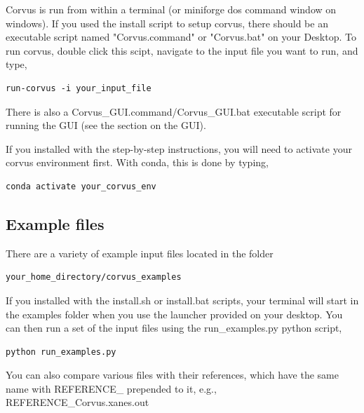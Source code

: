 Corvus is run from within a terminal (or miniforge dos command window on windows). If you used the 
install script to setup corvus, there should be an executable script named "Corvus.command" or "Corvus.bat" 
on your Desktop. To run corvus, double click this scipt, navigate to the input file you want 
to run, and type,
\begin{verbatim}
run-corvus -i your_input_file
\end{verbatim}
There is also a Corvus\_GUI.command/Corvus\_GUI.bat executable script for running the GUI (see the section on the GUI).

If you installed with the step-by-step instructions, you will need to activate your
corvus environment first. With conda, this is done by typing,
\begin{verbatim}
conda activate your_corvus_env
\end{verbatim}

\subsection{Example files}
There are a variety of example input files located in the folder
\begin{verbatim}
your_home_directory/corvus_examples
\end{verbatim}
If you installed with the install.sh or install.bat scripts, your terminal
will start in the examples folder when you use the launcher provided on 
your desktop. You can then run a set of the input files using the run\_examples.py
python script,
\begin{verbatim}
python run_examples.py
\end{verbatim}

You can also compare various files with their references, which have
the same name with REFERENCE\_ prepended to it, e.g., 
REFERENCE\_Corvus.xanes.out

